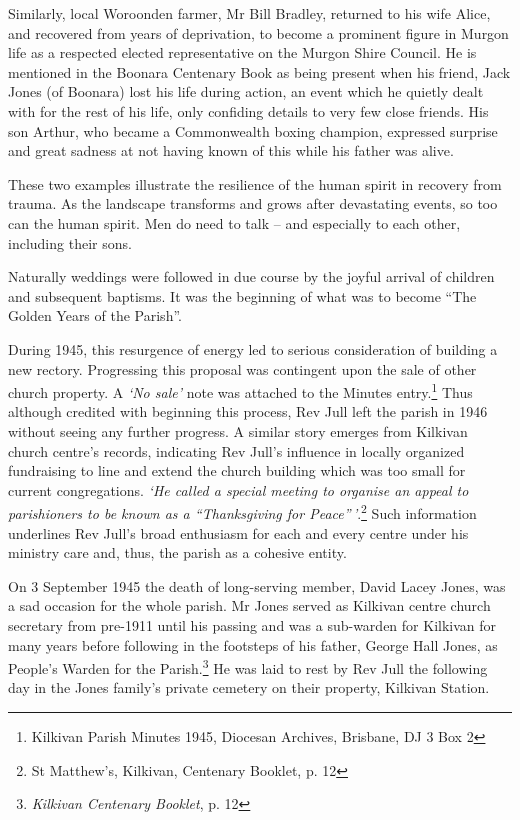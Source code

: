 Similarly, local Woroonden farmer, Mr Bill Bradley, returned to his wife Alice, and recovered from years of deprivation, to become a prominent figure in Murgon life as a respected elected representative on the Murgon Shire Council. He is mentioned in the Boonara Centenary Book as being present when his friend, Jack Jones (of Boonara) lost his life during action, an event which he quietly dealt with for the rest of his life, only confiding details to very few close friends. His son Arthur, who became a Commonwealth boxing champion, expressed surprise and great sadness at not having known of this while his father was alive.



These two examples illustrate the resilience of the human spirit in recovery from trauma. As the landscape transforms and grows after devastating events, so too can the human spirit. Men do need to talk -- and especially to each other, including their sons.



Naturally weddings were followed in due course by the joyful arrival of children and subsequent baptisms. It was the beginning of what was to become ``The Golden Years of the Parish''.



During 1945, this resurgence of energy led to serious consideration of building a new rectory. Progressing this proposal was contingent upon the sale of other church property. A \emph{`No sale'} note was attached to the Minutes entry.\footnote{Kilkivan Parish Minutes 1945, Diocesan Archives, Brisbane, DJ 3 Box 2} Thus although credited with beginning this process, Rev Jull left the parish in 1946 without seeing any further progress. A similar story emerges from Kilkivan church centre's records, indicating Rev Jull's influence in locally organized fundraising to line and extend the church building which was too small for current congregations. \emph{`He called a special meeting to organise an appeal to parishioners to be known as a ``Thanksgiving for Peace''\,'}.\footnote{St Matthew's, Kilkivan, Centenary Booklet, p. 12} Such information underlines Rev Jull's broad enthusiasm for each and every centre under his ministry care and, thus, the parish as a cohesive entity.


On 3 September 1945 the death of long-serving member, David Lacey Jones, was a sad occasion for the whole parish. Mr Jones served as Kilkivan centre church secretary from pre-1911 until his passing and was a sub-warden for Kilkivan for many years before following in the footsteps of his father, George Hall Jones, as People's Warden for the Parish.\footnote{\emph{Kilkivan Centenary Booklet}, p. 12} He was laid to rest by Rev Jull the following day in the Jones family's private cemetery on their property, Kilkivan Station.



